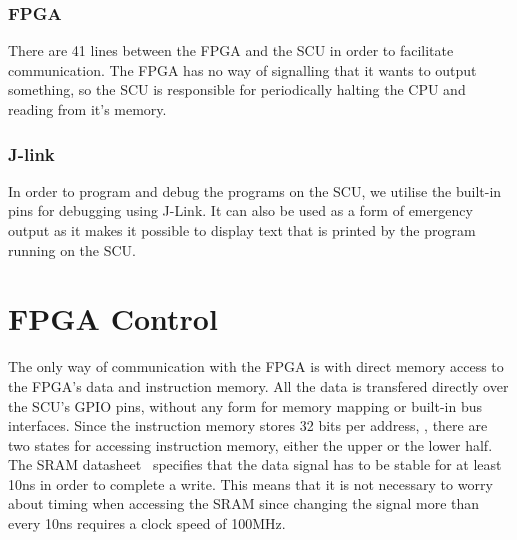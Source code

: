 \subsubsection{FPGA}
There are 41 lines between the FPGA and the SCU in order to facilitate communication.
The FPGA has no way of signalling that it wants to output something, so the SCU is responsible for periodically halting the CPU and reading from it's memory.

\subsubsection{J-link}
In order to program and debug the programs on the SCU, we utilise the built-in pins for debugging using J-Link.
It can also be used as a form of emergency output as it makes it possible to display text that is printed by the program running on the SCU.

\section{FPGA Control}
The only way of communication with the FPGA is with direct memory access to the FPGA's data and instruction memory.
All the data is transfered directly over the SCU's GPIO pins, without any form for memory mapping or built-in bus interfaces.
Since the instruction memory stores 32 bits per address, , there are two states for accessing instruction memory, either the upper or the lower half.
The SRAM datasheet~\cite{sram-datasheet} specifies that the data signal has to be stable for at least 10ns in order to complete a write.
This means that it is not necessary to worry about timing when accessing the SRAM since changing the signal more than every 10ns requires a clock speed of 100MHz.

